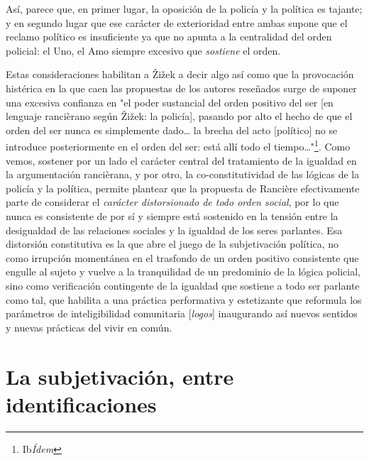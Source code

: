 Así, parece que, en primer lugar, la oposición de la policía y la
política es tajante; y en segundo lugar que ese carácter de exterioridad
entre ambas supone que el reclamo político es insuficiente ya que no
apunta a la centralidad del orden policial: el Uno, el Amo siempre
excesivo que \emph{sostiene} el orden.

Estas consideraciones habilitan a Žižek a decir algo así como que la
provocación histérica en la que caen las propuestas de los autores
reseñados surge de suponer una excesiva confianza en "el poder
sustancial del orden positivo del ser {[}en lenguaje rancièrano según
Žižek: la policía{]}, pasando por alto el hecho de que el orden del ser
nunca es simplemente dado\ldots{} la brecha del acto {[}político{]} no
se introduce posteriormente en el orden del ser: está allí todo el
tiempo\ldots"\footnote{Ib\emph{Ídem}}. Como vemos, sostener por un lado
el carácter central del tratamiento de la igualdad en la argumentación
rancièrana, y por otro, la co-constitutividad de las lógicas de la
policía y la política, permite plantear que la propuesta de Rancière
efectivamente parte de considerar el \emph{carácter distorsionado de
todo orden social}, por lo que nunca es consistente de por sí y siempre
está sostenido en la tensión entre la desigualdad de las relaciones
sociales y la igualdad de los seres parlantes. Esa distorsión
constitutiva es la que abre el juego de la subjetivación política, no
como irrupción momentánea en el trasfondo de un orden positivo
consistente que engulle al sujeto y vuelve a la tranquilidad de un
predominio de la lógica policial, sino como verificación contingente de
la igualdad que sostiene a todo ser parlante como tal, que habilita a
una práctica performativa y estetizante que reformula los parámetros de
inteligibilidad comunitaria {[}\emph{logos}{]} inaugurando así nuevos
sentidos y nuevas prácticas del vivir en común.

\section{La subjetivación, entre identificaciones}

